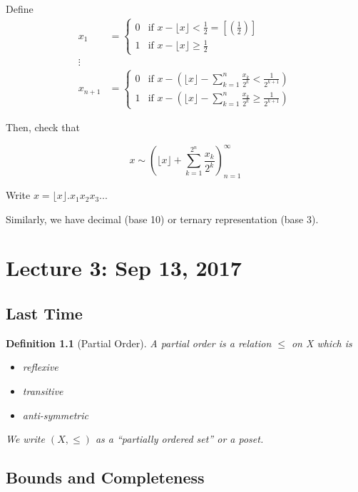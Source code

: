 \documentclass[11pt, oneside]{book}
\theoremstyle{break}
\newtheorem{defn}{Definition}[section]
\newcommand{\floor}[1]{\lfloor #1 \rfloor}	%
\begin{document}
Define
\begin{align}
	x_1 &= 
	\begin{cases}
		0 & \text{if } x - \floor{x} < \frac{1}{2} = [(\frac{1}{2} )] \\
		1 & \text{if } x - \floor{x} \geq \frac{1}{2}
	\end{cases} \\
	\vdots \\
	x_{n + 1} &=
	\begin{cases}
		0 & \text{if } x - \left(\floor{x} - \sum_{k=1}^{n} \frac{x_k}{2^k} < \frac{1}{2^{k+1}} \right) \\
		1 & \text{if } x - \left(\floor{x} - \sum_{k=1}^{n} \frac{x_k}{2^k} \geq \frac{1}{2^{k + 1}} \right)
	\end{cases}
\end{align}

Then, check that

\begin{equation}
	x \sim \left(\floor{x} + \sum_{k=1}^{2^n} \frac{x_k}{2^k}\right)_{n=1}^\infty
\end{equation}

Write $x = \floor{x}.x_1 x_2 x_3 ...$

Similarly, we have decimal (base 10) or ternary representation (base 3).

\chapter{Lecture 3: Sep 13, 2017}\label{chp:lec3}

\section{Last Time}

\begin{defn}[Partial Order]
	A partial order is a relation $\leq$ on X which is
	\begin{itemize}
		\item reflexive
		\item transitive
		\item anti-symmetric
	\end{itemize}

	We write $(X, \leq)$ as a ``partially ordered set'' or a poset.
\end{defn}

\section{Bounds and Completeness}\label{sect:bounds_completeness}
\end{document}
